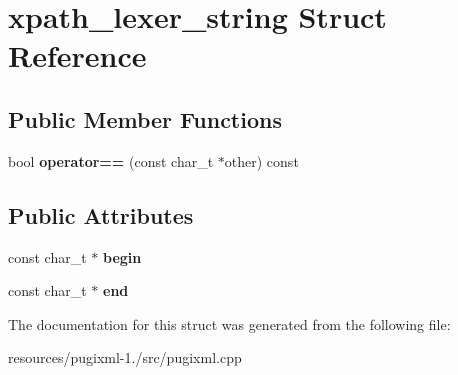 \hypertarget{structxpath__lexer__string}{\section{xpath\+\_\+lexer\+\_\+string Struct Reference}
\label{structxpath__lexer__string}
}
\subsection*{Public Member Functions}
\begin{DoxyCompactItemize}
\item 
\hypertarget{structxpath__lexer__string_ac19adfd75832be8eff3f430aa3cb3c14}{bool {\bfseries operator==} (const char\+\_\+t $\ast$other) const }\label{structxpath__lexer__string_ac19adfd75832be8eff3f430aa3cb3c14}

\end{DoxyCompactItemize}
\subsection*{Public Attributes}
\begin{DoxyCompactItemize}
\item 
\hypertarget{structxpath__lexer__string_a0b985863d7363a75d4fdd0a7ece1fca0}{const char\+\_\+t $\ast$ {\bfseries begin}}\label{structxpath__lexer__string_a0b985863d7363a75d4fdd0a7ece1fca0}

\item 
\hypertarget{structxpath__lexer__string_a13bbedeca2f8c2fb1e294325eea66878}{const char\+\_\+t $\ast$ {\bfseries end}}\label{structxpath__lexer__string_a13bbedeca2f8c2fb1e294325eea66878}

\end{DoxyCompactItemize}


The documentation for this struct was generated from the following file\+:\begin{DoxyCompactItemize}
\item 
resources/pugixml-\/1./src/pugixml.\+cpp\end{DoxyCompactItemize}
